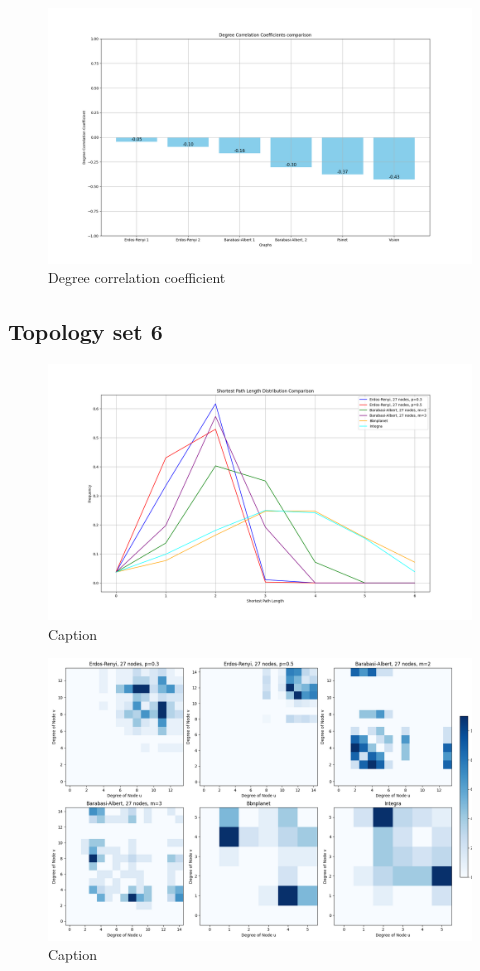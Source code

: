 \begin{figure}
    \centering
    \includegraphics[width=0.9\linewidth]{images/FINAL-TOPO-COMP/Degree-correlation-coeff/deg-coeff-24.png}
    \caption{Degree correlation coefficient}
    \label{fig:enter-label}
\end{figure}

\subsection{Topology set 6}
\begin{figure}
    \centering
    \includegraphics[width=0.9\linewidth]{images/FINAL-TOPO-COMP/line-27.png}
    \caption{Caption}
    \label{fig:enter-label}
\end{figure}

\begin{figure}
    \centering
    \includegraphics[width=0.9\linewidth]{images/FINAL-TOPO-COMP/Degree-correlation-matrices/27-matrix.png}
    \caption{Caption}
    \label{fig:enter-label}
\end{figure}

